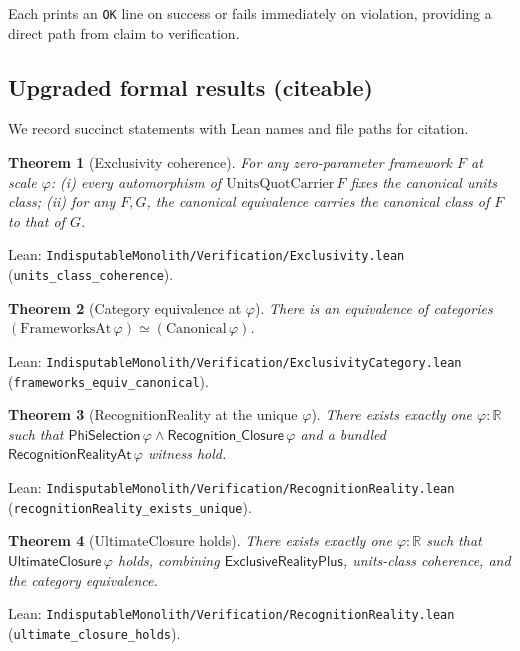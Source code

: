 \documentclass[11pt,a4paper,twoside]{article}
\numberwithin{equation}{section}
\theoremstyle{customthm}
\newtheorem{theorem}{Theorem}[section]
\theoremstyle{customdef}
\theoremstyle{customrem}
\begin{document}
Each prints an \texttt{OK} line on success or fails immediately on violation, providing a direct path from claim to verification.

\subsection{Upgraded formal results (citeable)}\label{subsec:upgraded-results}

We record succinct statements with Lean names and file paths for citation.

\begin{theorem}[Exclusivity coherence]\label{thm:units-class-coherence}
For any zero-parameter framework $F$ at scale $\varphi$:
(i) every automorphism of $\mathrm{UnitsQuotCarrier}\,F$ fixes the canonical units class; (ii) for any $F,G$, the canonical equivalence carries the canonical class of $F$ to that of $G$.
\end{theorem}
\noindent Lean: \texttt{IndisputableMonolith/Verification/Exclusivity.lean} (\texttt{units\_class\_coherence}).

\begin{theorem}[Category equivalence at $\varphi$]\label{thm:frameworks-equiv-canonical}
There is an equivalence of categories \((\mathrm{FrameworksAt}\,\varphi) \simeq (\mathrm{Canonical}\,\varphi)\).
\end{theorem}
\noindent Lean: \texttt{IndisputableMonolith/Verification/ExclusivityCategory.lean} (\texttt{frameworks\_equiv\_canonical}).

\begin{theorem}[RecognitionReality at the unique $\varphi$]\label{thm:recognitionReality-exists-unique}
There exists exactly one $\varphi : \mathbb{R}$ such that \(\mathsf{PhiSelection}\,\varphi \wedge \mathsf{Recognition\_Closure}\,\varphi\) and a bundled \(\mathsf{RecognitionRealityAt}\,\varphi\) witness hold.
\end{theorem}
\noindent Lean: \texttt{IndisputableMonolith/Verification/RecognitionReality.lean} (\texttt{recognitionReality\_exists\_unique}).

\begin{theorem}[UltimateClosure holds]\label{thm:ultimate-closure}
There exists exactly one $\varphi : \mathbb{R}$ such that \(\mathsf{UltimateClosure}\,\varphi\) holds, combining \(\mathsf{ExclusiveRealityPlus}\), units-class coherence, and the category equivalence.
\end{theorem}
\noindent Lean: \texttt{IndisputableMonolith/Verification/RecognitionReality.lean} (\texttt{ultimate\_closure\_holds}).
\end{document}
